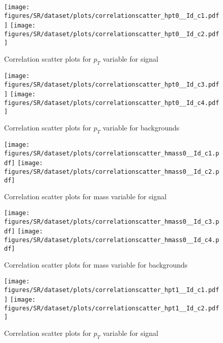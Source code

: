 \begin{figure}[!htb]%
\centering
\texttt{[image: figures/SR/dataset/plots/correlationscatter\_hpt0\_\_Id\_c1.pdf]}
\texttt{[image: figures/SR/dataset/plots/correlationscatter\_hpt0\_\_Id\_c2.pdf]}
\caption{ Correlation scatter plots for \HZZ $p_{T}$  variable for signal}%
\label{fig:correlations_SR_hpt0_S}                                                       
\end{figure}



\begin{figure}[!htb]%
\centering
\texttt{[image: figures/SR/dataset/plots/correlationscatter\_hpt0\_\_Id\_c3.pdf]}
\texttt{[image: figures/SR/dataset/plots/correlationscatter\_hpt0\_\_Id\_c4.pdf]}
\caption{ Correlation scatter plots for \HZZ $p_{T}$ variable for backgrounds}%
\label{fig:correlations_SR_hpt0_BG}                                                       
\end{figure}


\begin{figure}[!htb]%
\centering
\texttt{[image: figures/SR/dataset/plots/correlationscatter\_hmass0\_\_Id\_c1.pdf]}
\texttt{[image: figures/SR/dataset/plots/correlationscatter\_hmass0\_\_Id\_c2.pdf]}
\caption{ Correlation scatter plots for \HZZ mass  variable for signal}%
\label{fig:correlations_SR_hmass0_S}                                                       
\end{figure}



\begin{figure}[!htb]%
\centering
\texttt{[image: figures/SR/dataset/plots/correlationscatter\_hmass0\_\_Id\_c3.pdf]}
\texttt{[image: figures/SR/dataset/plots/correlationscatter\_hmass0\_\_Id\_c4.pdf]}
\caption{ Correlation scatter plots for \HZZ mass variable for backgrounds}%
\label{fig:correlations_SR_hmass0_BG}                                                       
\end{figure}




\begin{figure}[!htb]%
\centering
\texttt{[image: figures/SR/dataset/plots/correlationscatter\_hpt1\_\_Id\_c1.pdf]}
\texttt{[image: figures/SR/dataset/plots/correlationscatter\_hpt1\_\_Id\_c2.pdf]}
\caption{ Correlation scatter plots for \HBB $p_{T}$  variable for signal}%
\label{fig:correlations_SR_hpt1_S}                                                       
\end{figure}



